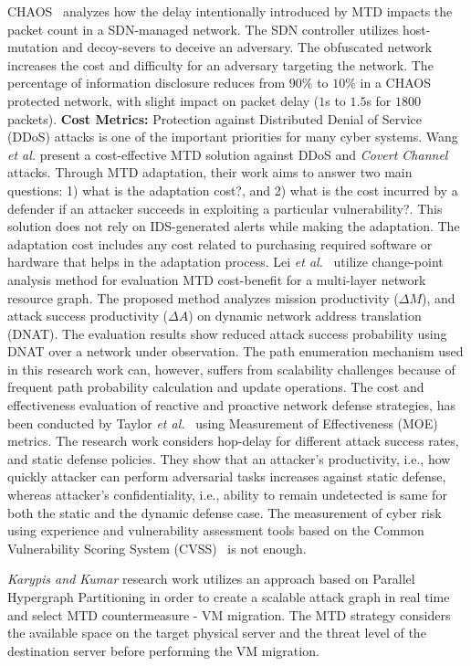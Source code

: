 CHAOS~ analyzes how the delay intentionally introduced by MTD impacts the packet count in a SDN-managed network. The SDN controller utilizes host-mutation and {decoy-severs} to deceive an adversary. The obfuscated network increases the {cost} and {difficulty} for an adversary targeting the network. The percentage of {information disclosure} reduces from $90\%$ to $10\%$ in a CHAOS protected network, with slight impact on packet delay ($1$s to $1.5$s for $1800$ packets). 
\textbf{Cost Metrics:} Protection against Distributed Denial of Service (DDoS) attacks is one of the important priorities for many cyber systems. Wang \textit{et al.}  present a cost-effective MTD solution against DDoS and {\em Covert Channel} attacks. Through MTD adaptation, their work  aims to answer two main questions: 1) what is the adaptation cost?, and 2) what is the cost incurred by a defender if an attacker succeeds in exploiting a particular vulnerability?. This solution does not rely on IDS-generated alerts while making the adaptation. The adaptation cost includes any cost related to purchasing required software or hardware that helps in the adaptation process. Lei \textit{et al.}~ utilize change-point analysis method for evaluation MTD cost-benefit for a multi-layer network resource graph. The proposed method analyzes mission productivity ($\Delta M$), and attack success productivity ($\Delta A$) on dynamic network address translation (DNAT). The evaluation results show reduced attack success probability using DNAT over a network under observation. The path enumeration mechanism used in this research work can, however, suffers from scalability challenges because of frequent path probability calculation and update operations. The cost and effectiveness evaluation of reactive and proactive network defense strategies, has been conducted by Taylor \emph{et al.}~ using Measurement of Effectiveness (MOE) metrics. The research work considers hop-delay for different attack success rates, and static defense policies. They show that an attacker's productivity, i.e., how quickly attacker can perform adversarial tasks increases against static defense, whereas attacker's confidentiality, i.e., ability to remain undetected is same for both the static and the dynamic defense case. 
\iffalse
The measurement of cyber risk using experience and vulnerability assessment tools based on the Common Vulnerability Scoring System (CVSS)~ is not enough.

\textit{Karypis and Kumar}   research work utilizes an approach based on Parallel Hypergraph Partitioning  in order to create a scalable attack graph in real time and select MTD countermeasure - VM migration. The MTD strategy considers the available space on the target physical server and the threat level of the destination server before performing the VM migration.

